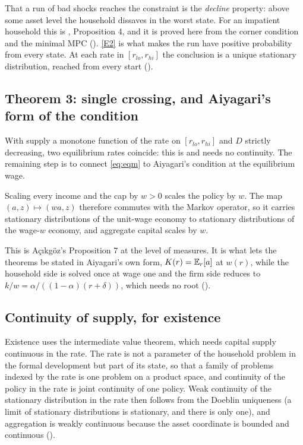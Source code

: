 That a run of bad shocks reaches the constraint is the \emph{decline} property: above some asset
level the household dissaves in the worst state. For an impatient household this is
\citet{Acikgoz2018}, Proposition 4, and it is proved here from the corner condition and the minimal
MPC (). \ref{E2} is what makes the run have positive probability from every
state. At each rate in $[r_{lo},r_{hi}]$ the conclusion is a unique stationary distribution,
reached from every start ().

\subsection{Theorem 3: single crossing, and Aiyagari's form of the condition}\label{sec:homog}

With supply a monotone function of the rate on $[r_{lo},r_{hi}]$ and $D$ strictly decreasing, two
equilibrium rates coincide: this is  and needs no
continuity. The remaining step is to connect \eqref{eq:eqm} to Aiyagari's condition at the
equilibrium wage.

\begin{proposition}
Scaling every income and the cap by $w>0$ scales the policy by $w$. The map $(a,z)\mapsto(wa,z)$
therefore commutes with the Markov operator, so it carries stationary distributions of the unit-wage
economy to stationary distributions of the wage-$w$ economy, and aggregate capital scales by $w$.
\end{proposition}

This is Açıkgöz's Proposition 7 at the level of measures. It is what lets the theorems be stated in
Aiyagari's own form, $K(r)=\mathbb{E}_r[a]$ at $w(r)$, while the household side is solved once at wage one
and the firm side reduces to $k/w=\alpha/((1-\alpha)(r+\delta))$, which needs no root
().

\subsection{Continuity of supply, for existence}\label{sec:cont}

Existence uses the intermediate value theorem, which needs capital supply continuous in the rate.
The rate is not a parameter of the household problem in the formal development but part of its
state, so that a family of problems indexed by the rate is one problem on a product space, and
continuity of the policy in the rate is joint continuity of one policy. Weak continuity of the
stationary distribution in the rate then follows from the Doeblin uniqueness (a limit of stationary
distributions is stationary, and there is only one), and aggregation is weakly continuous
because the asset coordinate is bounded and continuous ().

